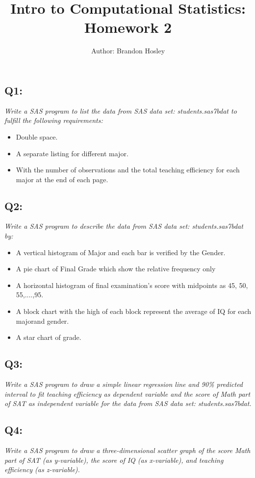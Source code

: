 \documentclass[a4paper,man,natbib]{apa6}
\title{Intro to Computational Statistics: Homework 2}
\author{Author: Brandon Hosley}
\affiliation{Instructor: Liang Kong, Ph.D}
\begin{document}
\maketitle
\singlespacing
	
\subsection*{Q1:}
\emph{Write a SAS program to list the data from SAS data set: students.sas7bdat to fulfill the following requirements:}
\begin{itemize}
	\itemsep-0.5em
	\item Double space.
	\item A separate listing for different major.
	\item With the number of observations and the total teaching efficiency for each major at the end of each page. 
\end{itemize}

\subsection*{Q2:}
\emph{Write a SAS program to describe the data from SAS data set: students.sas7bdat by:}
\begin{itemize}
	\itemsep-0.5em
	\item A vertical histogram of Major and each bar is verified by the Gender.
	\item A pie chart of Final Grade which show the relative frequency only
	\item A horizontal histogram of final examination's score with midpoints as 45, 50, 55,....,95.
	\item A block chart with the high of each block represent the average of IQ for each majorand gender.
	\item A star chart of grade.
\end{itemize}

\subsection*{Q3:}
\emph{Write a SAS program to draw a  simple linear regression line and 90\% predicted interval to fit teaching efficiency as dependent variable and the score of Math part of SAT as independent variable for the data from SAS data set: students.sas7bdat. }

\subsection*{Q4:}
\emph{Write a SAS program to draw a three-dimensional scatter graph of the score Math part of SAT (as y-variable), the score of IQ (as x-variable), and teaching efficiency (as z-variable).}
	
\end{document}
